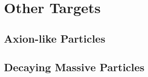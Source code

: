\section{Other Targets}

\subsection{Axion-like Particles}

\subsection{Decaying Massive Particles}






